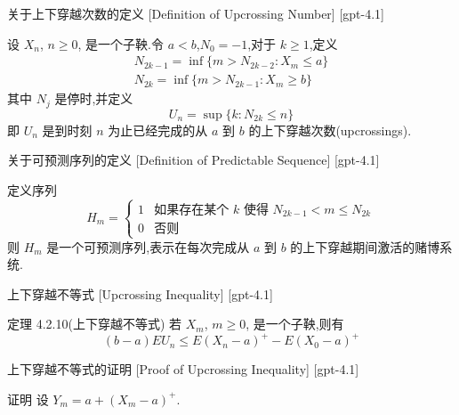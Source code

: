 \documentclass[UTF8]{ctexart}
\begin{document}
    \begin{dfn}
        {关于上下穿越次数的定义}
        [Definition of Upcrossing Number]
        [gpt-4.1]
        
设 $X_n$, $n \geq 0$, 是一个子鞅.令 $a < b$,$N_0 = -1$,对于 $k \geq 1$,定义
\[
\begin{array}{r}
N_{2k-1} = \operatorname{inf}\{m > N_{2k-2} : X_m \leq a\} \\
N_{2k} = \operatorname{inf}\{m > N_{2k-1} : X_m \geq b\}
\end{array}
\]
其中 $N_j$ 是停时,并定义
\[
U_n = \sup\{k : N_{2k} \leq n\}
\]
即 $U_n$ 是到时刻 $n$ 为止已经完成的从 $a$ 到 $b$ 的上下穿越次数(upcrossings).

    \end{dfn}
    
    
    
    \begin{dfn}
        {关于可预测序列的定义}
        [Definition of Predictable Sequence]
        [gpt-4.1]
        
定义序列
\[
H_m = \left\{
\begin{array}{ll}
1 & \text{如果存在某个 } k \text{ 使得 } N_{2k-1} < m \leq N_{2k} \\
0 & \text{否则}
\end{array}
\right.
\]
则 $H_m$ 是一个可预测序列,表示在每次完成从 $a$ 到 $b$ 的上下穿越期间激活的赌博系统.

    \end{dfn}
    
    
    
    \begin{thm}
        {上下穿越不等式}
        [Upcrossing Inequality]
        [gpt-4.1]
        
定理 4.2.10(上下穿越不等式) 若 $X_m$, $m \geq 0$, 是一个子鞅,则有
\[
(b - a) E U_n \leq E(X_n - a)^+ - E(X_0 - a)^+
\]

    \end{thm}
    
    
    
    \begin{prf}
        {上下穿越不等式的证明}
        [Proof of Upcrossing Inequality]
        [gpt-4.1]
        
证明 设 $Y_m = a + (X_m - a)^+$.

    \end{prf}
    
\end{document}
